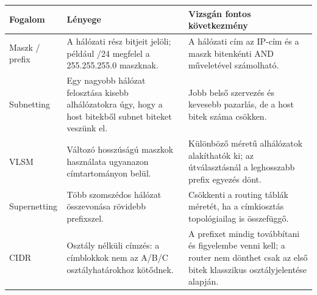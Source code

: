 \begin{tabularx}{\textwidth}{L{28mm}X X}
\toprule
\textbf{Fogalom} & \textbf{Lényege} & \textbf{Vizsgán fontos következmény} \\
\midrule
Maszk / prefix & A hálózati rész bitjeit jelöli; például /24 megfelel a 255.255.255.0 maszknak. & A hálózati cím az IP-cím és a maszk bitenkénti AND műveletével számolható. \\
Subnetting & Egy nagyobb hálózat felosztása kisebb alhálózatokra úgy, hogy a host bitekből subnet biteket veszünk el. & Jobb belső szervezés és kevesebb pazarlás, de a host bitek száma csökken. \\
VLSM & Változó hosszúságú maszkok használata ugyanazon címtartományon belül. & Különböző méretű alhálózatok alakíthatók ki; az útválasztásnál a leghosszabb prefix egyezés dönt. \\
Supernetting & Több szomszédos hálózat összevonása rövidebb prefixszel. & Csökkenti a routing táblák méretét, ha a címkiosztás topológiailag is összefüggő. \\
CIDR & Osztály nélküli címzés: a címblokkok nem az A/B/C osztályhatárokhoz kötődnek. & A prefixet mindig továbbítani és figyelembe venni kell; a router nem dönthet csak az első bitek klasszikus osztályjelentése alapján. \\
\bottomrule
\end{tabularx}
